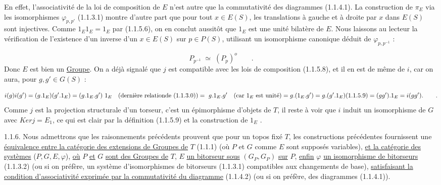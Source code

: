 En effet, l'associativité de la loi de composition de $E$ n'est autre que la commutativité des diagrammes (1.1.4.1). La construction de $\pi_E$ via les isomorphismes $\varphi_{p,p'}$ (1.1.3.1) montre d'autre part que pour tout $x \in E(S)$, les translations à gauche et à droite par $x$ dans $E(S)$ sont injectives. Comme $1_E1_E = 1_E$ par (1.1.5.6), on en conclut aussitôt que $1_E$ est une unité bilatère de $E$. Nous laissons au lecteur la vérification de l'existence d'un inverse d'un $x \in E(S)$ sur $p \in P(S)$, utilisant un isomorphisme canonique déduit de $\varphi_{p,p^{-1}}$ :

\begin{equation}\tag{1.1.5.10}
P_{p^{-1}} \;\simeq\; (P_p)^{o} \qquad .
\end{equation}
Donc $E$ est bien un \underline{Groupe}. On a déjà signalé que $j$ est compatible avec les lois de composition (1.1.5.8), et il en est de même de $i$, car on aura, pour $g,g' \in G(S)$ :

\begin{equation*}
i(g)i(g') = (g.1_E)(g'.1_E) = (g.1_E.g')\ 1_E \quad (\text{dernière relation} \\ \text{de } (1.1.3.0)) = \ g.1_E.g' \quad (\text{car } 1_E \text{ est unité}) = g.(1_E.g') = g.(g'.1_E) \\ (1.1.5.9) = (gg').1_E = i(gg'). \qquad .
\end{equation*}
Comme $j$ est la projection structurale d'un torseur, c'est un épimorphisme d'objets de \underline{$T$}, il reste à voir que $i$ induit un isomorphisme de $G$ avec $Ker j = E_1$, ce qui est clair par la définition (1.1.5.9) et la construction de $1_E$ .



1.1.6.  Nous admettrons que les raisonnements précédents prouvent que pour un topos fixé \underline{$T$}, les constructions précédentes fournissent une \underline{équivalence entre la catégorie des extensions de Groupes de} \underline{$T$} (1.1.1) (où $P$ et $G$ comme $E$ sont supposés variables), \underline{et la catégorie des systèmes} ($P,G,E,\varphi$), \underline{où} $P$ \underline{et} $G$ \underline{sont des Groupes de} \underline{$T$}, $E$ \underline{un bitorseur sous} $(G_P,G_P)$ \underline{sur} $P$, \underline{enfin} $\varphi$ \underline{un isomorphisme de bitorseurs} (1.1.3.2) (ou si on préfère, un système d'isomorphismes de bitorseurs (1.1.3.1) compatibles aux changements de base), \underline{satisfaisant la condition d'associativité exprimée par la commutativité du diagramme} (1.1.4.2) (ou si on préfère, des diagrammes (1.1.4.1)).

